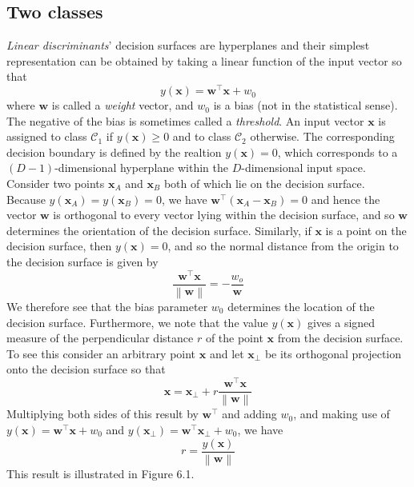 \documentclass[twoside]{article}
\newcommand{\norm}[1]{\left\lVert #1 \right\rVert}
\begin{document}
\subsection{Two classes}
\textit{Linear discriminants}' decision surfaces are hyperplanes and their simplest representation can be obtained by taking a linear function of the input vector so that
\begin{equation*}
    y(\boldsymbol{x}) = \boldsymbol{w^\intercal x} + w_0
\end{equation*}
where $\boldsymbol{w}$ is called a \textit{weight} vector, and $w_0$ is a bias (not in the statistical sense). The negative of the bias is sometimes called a \textit{threshold}. An input vector $\boldsymbol{x}$ is assigned to class $\mathcal{C}_1$ if $y(\boldsymbol{x}) \geq 0$ and to class $\mathcal{C}_2$ otherwise. The corresponding decision boundary is defined by the realtion $y(\boldsymbol{x}) = 0$, which corresponds to a $(D - 1)$-dimensional hyperplane within the $D$-dimensional input space. Consider two points $\boldsymbol{x}_A$ and $\boldsymbol{x}_B$ both of which lie on the decision surface.\\
Because $y(\boldsymbol{x}_A) = y(\boldsymbol{x}_B) = 0$, we have $\boldsymbol{w}^\intercal(\boldsymbol{x}_A- \boldsymbol{x}_B) = 0$ and hence the vector $\boldsymbol{w}$ is orthogonal to every vector lying within the decision surface, and so $\boldsymbol{w}$ determines the orientation of the decision surface. Similarly, if $\boldsymbol{x}$ is a point on the decision surface, then $y(\boldsymbol{x}) = 0$, and so the normal distance from the origin to the decision surface is given by
\begin{equation*}
    \frac{\boldsymbol{w^\intercal x}}{\norm{\boldsymbol{w}}} = - \frac{w_o}{\boldsymbol{w}}
\end{equation*}
We therefore see that the bias parameter $w_0$ determines the location of the decision surface. Furthermore, we note that the value $y(\boldsymbol{x})$ gives a signed measure of the perpendicular distance $r$ of the point $\boldsymbol{x}$ from the decision surface. To see this consider an arbitrary point $\boldsymbol{x}$ and let $\boldsymbol{x}_\perp$ be its orthogonal projection onto the decision surface so that
\begin{equation*}
    \boldsymbol{x} = \boldsymbol{x}_\perp + r\frac{\boldsymbol{w^\intercal x}}{\norm{\boldsymbol{w}}}
\end{equation*}
Multiplying both sides of this result by $\boldsymbol{w}^\intercal$ and adding $w_0$, and making use of $y(\boldsymbol{x}) = \boldsymbol{w^\intercal x} + w_0$ and $y(\boldsymbol{x}_\perp) = \boldsymbol{w^\intercal x}_\perp + w_0$, we have
\begin{equation*}
    r = \frac{y(\boldsymbol{x})}{\norm{\boldsymbol{w}}}
\end{equation*}
This result is illustrated in Figure 6.1.
\end{document}
